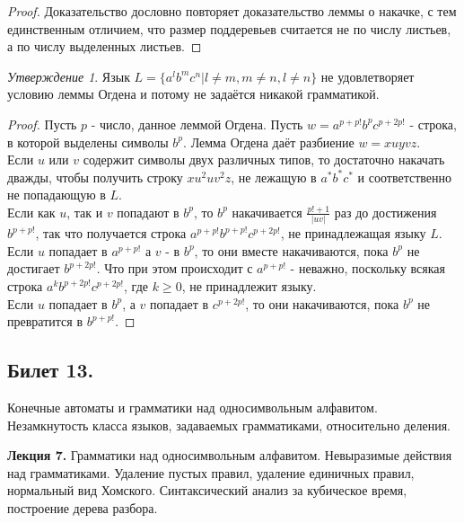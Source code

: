 \documentclass[a4paper]{article}
\theoremstyle{indented}
\theoremstyle{definition}
\theoremstyle{remark}
\newtheorem{stat}{Утверждение}
\begin{document}
\begin{proof}
    Доказательство дословно повторяет доказательство леммы о накачке, с тем единственным отличием, что размер поддеревьев считается не по числу листьев, а по числу выделенных листьев.
\end{proof}

\begin{stat}
    Язык $L = \{ a^lb^mc^n | l\neq m, m\neq n, l\neq n \}$ не удовлетворяет условию леммы Огдена и потому не задаётся никакой грамматикой.
\end{stat}

\begin{proof}
    Пусть $p$ - число, данное леммой Огдена. Пусть $w = a^{p+p!}b^{p}c^{p+2p!}$ - строка, в которой выделены символы $b^p$. Лемма Огдена даёт разбиение $w = xuyvz$. \\ 

    Если $u$ или $v$ содержит символы двух различных типов, то достаточно накачать дважды, чтобы получить строку $xu^2uv^2z$, не лежащую в $a^*b^*c^*$ и соответственно не попадающую в $L$. \\ 

    Если как $u$, так и $v$ попадают в $b^p$, то $b^p$ накачивается $\frac{p! + 1}{|uv|}$ раз до достижения $b^{p+p!}$, так что получается строка $a^{p+p!}b^{p+p!}c^{p+2p!}$, не принадлежащая языку $L$. \\ 

    Если $u$ попадает в $a^{p+p!}$ а $v$ - в $b^p$, то они вместе накачиваются, пока $b^p$ не достигает $b^{p+2p!}$. Что при этом происходит с $a^{p+p!}$ - неважно, поскольку всякая строка $a^kb^{p+2p!}c^{p+2p!}$, где $k \geq 0$, не принадлежит языку. \\ 

    Если $u$ попадает в $b^p$, а $v$ попадает в $c^{p+2p!}$, то они накачиваются, пока $b^p$ не превратится в $b^{p+p!}$.
\end{proof}



\newpage 

\subsection{Билет 13.}

Конечные автоматы и грамматики над односимвольным алфавитом. Незамкнутость класса языков, задаваемых грамматиками, относительно деления.

\hrulefill

\textbf{Лекция 7.} Грамматики над односимвольным алфавитом. Невыразимые действия над грамматиками. Удаление пустых правил, удаление единичных правил, нормальный вид Хомского. Синтаксический анализ за кубическое время, построение дерева разбора.
\end{document}
